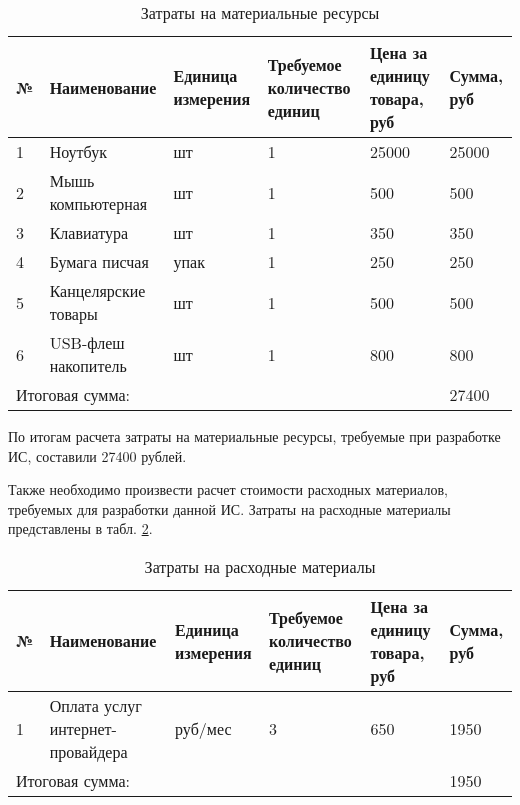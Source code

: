 \begin{footnotesize}
\begin{longtable}[h]{|p{}|p{}|p{}|p{}|p{}|p{}|}
	\caption{\label{tab:zatrat}Затраты на материальные ресурсы} \\
	\hline
		\textbf{№} &
		\textbf{Наименование} &
		\textbf{Единица измерения} &
		\textbf{Требуемое количество единиц} &
		\textbf{Цена за единицу товара, руб} &
		\textbf{Сумма, руб} \\
	\hline
		1 & Ноутбук & шт & 1 & 25000 & 25000 \\ \hline
		2 & Мышь компьютерная & шт & 1 & 500 & 500 \\ \hline
		3 & Клавиатура & шт & 1 & 350 & 350 \\ \hline
		4 & Бумага писчая & упак & 1 & 250 & 250 \\ \hline
		5 & Канцелярские товары & шт & 1 & 500 & 500 \\ \hline
		6 & USB-флеш накопитель & шт & 1 & 800 & 800 \\ \hline
		\multicolumn{5}{|l|}{Итоговая сумма:} & 27400 \\ \hline
\end{longtable}
\end{footnotesize}

По итогам расчета затраты на материальные ресурсы, требуемые при разработке ИС, составили 27400 рублей.

Также необходимо произвести расчет стоимости расходных материалов, требуемых для разработки данной ИС. Затраты на расходные материалы представлены в табл. \ref{tab:zatrat_rash}.

\begin{footnotesize}
\begin{longtable}[h]{|p{}|p{}|p{}|p{}|p{}|p{}|}
	\caption{\label{tab:zatrat_rash}Затраты на расходные материалы} \\
	\hline
		\textbf{№} &
		\textbf{Наименование} &
		\textbf{Единица измерения} &
		\textbf{Требуемое количество единиц} &
		\textbf{Цена за единицу товара, руб} &
		\textbf{Сумма, руб} \\
	\hline
		1 & Оплата услуг интернет-провайдера & руб/мес & 3 & 650 & 1950 \\ \hline
		\multicolumn{5}{|l|}{Итоговая сумма:} & 1950 \\ \hline
\end{longtable}
\end{footnotesize}

